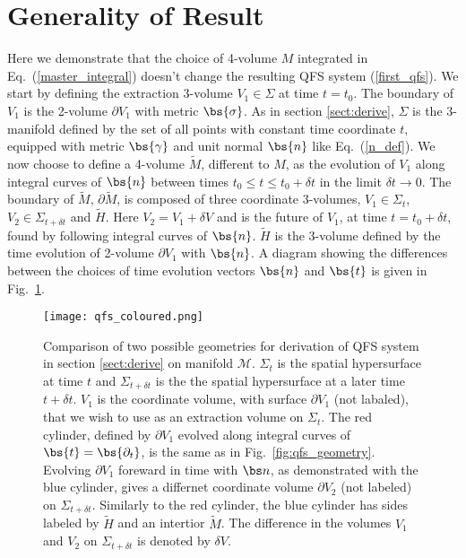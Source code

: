\section{Generality of Result} \label{sect:generality}
Here we demonstrate that the choice of 4-volume $M$ integrated in Eq.~(\ref{master_integral}) doesn't change the resulting QFS system (\ref{first_qfs}). We start by defining the extraction 3-volume $V_1\in\Sigma$ at time $t=t_0$. The boundary of $V_1$ is the 2-volume $\partial V_1$ with metric $\bs{\sigma}$. As in section \ref{sect:derive}, $\Sigma$ is the 3-manifold defined by the set of all points with constant time coordinate $t$, equipped with metric $\bs{\gamma}$ and unit normal $\bs{n}$ like Eq.~(\ref{n_def}). We now choose to define a 4-volume $\tilde{M}$, different to $M$, as the evolution of $V_1$ along integral curves of $\bs{n}$ between times $t_0 \leq t \leq t_0 + \delta t$ in the limit $\delta t \rightarrow 0$. The boundary of $\tilde{M}$, $\partial \tilde M$, is composed of three coordinate 3-volumes, $V_1\in\Sigma_t$, $V_2\in\Sigma_{t+\delta t}$ and $\tilde{H}$. Here $V_2=V_1 + \delta V$ and is the future of $V_1$, at time $t=t_0 +\delta t$, found by following integral curves of $\bs{n}$. $\tilde{H}$ is the 3-volume defined by the time evolution of 2-volume $\partial V_1$ with $\bs{n}$. A diagram showing the differences between the choices of time evolution vectors $\bs{n}$ and $\bs{t}$ is given in Fig.~\ref{fig:qfs_comparison}.


\begin{figure}[h]
{\texttt{[image: qfs\_coloured.png]}}
\caption{Comparison of two possible geometries for derivation of QFS system in section \ref{sect:derive} on manifold $\mathcal{M}$. $\Sigma_t$ is the spatial hypersurface at time $t$ and $\Sigma_{t+\delta t}$ is the the spatial hypersurface at a later time $t+\delta t$. $V_1$ is the coordinate volume, with surface $\partial V_1$ (not labaled), that we wish to use as an extraction volume on $\Sigma_t$. The red cylinder, defined by $\partial V_1$ evolved along integral curves of $\bs{t}=\bs{\partial_t}$, is the same as in Fig.~\ref{fig:qfs_geometry}. Evolving $\partial V_1$ foreward in time with $\bs n$, as demonstrated with the blue cylinder, gives a differnet coordinate volume $\partial V_2$ (not labeled) on $\Sigma_{t+\delta t}$. Similarly to the red cylinder, the blue cylinder has sides labeled by $\tilde{H}$ and an intertior $\tilde{M}$. The difference in the volumes $V_1$ and $V_2$ on $\Sigma_{t+\delta t}$ is denoted by $\delta V.$ }
\label{fig:qfs_comparison}
\end{figure}

